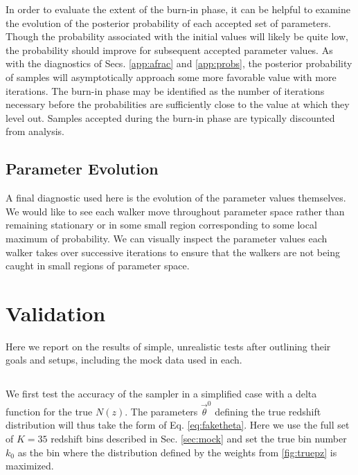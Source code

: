 \documentclass[12pt, onecolumn]{emulateapj}
\begin{document}
In order to evaluate the extent of the burn-in phase, it can be helpful to examine the evolution of the posterior probability of each accepted set of parameters.  Though the probability associated with the initial values will likely be quite low, the probability should improve for subsequent accepted parameter values.  As with the diagnostics of Secs. \ref{app:afrac} and \ref{app:probs}, the posterior probability of samples will asymptotically approach some more favorable value with more iterations.  The burn-in phase may be identified as the number of iterations necessary before the probabilities are sufficiently close to the value at which they level out.  Samples accepted during the burn-in phase are typically discounted from analysis.

\subsection{Parameter Evolution}
\label{app:params}

A final diagnostic used here is the evolution of the parameter values themselves.  We would like to see each walker move throughout parameter space rather than remaining stationary or in some small region corresponding to some local maximum of probability.  We can visually inspect the parameter values each walker takes over successive iterations to ensure that the walkers are not being caught in small regions of parameter space.

\section{Validation}
\label{app:valid}

Here we report on the results of simple, unrealistic tests after outlining their goals and setups, including the mock data used in each.

\subsection{}
\label{app:fake}

We first test the accuracy of the sampler in a simplified case with a delta function for the true $N(z)$.  The parameters $\vec{\theta}^{0}$ defining the true redshift distribution will thus take the form of Eq. \ref{eq:faketheta}.  Here we use the full set of $K=35$ redshift bins described in Sec. \ref{sec:mock} and set the true bin number $k_{0}$ as the bin where the distribution defined by the weights from \ref{fig:truepz} is maximized.
\end{document}
